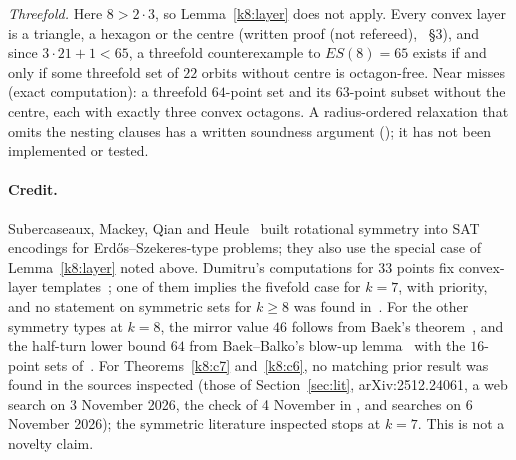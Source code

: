 \emph{Threefold.} Here $8>2\cdot3$, so Lemma~\ref{k8:layer} does not apply. Every convex layer is a triangle, a
hexagon or the centre (written proof (not refereed), ~\S3), and since $3\cdot21+1<65$, a threefold
counterexample to $ES(8)=65$ exists if and only if some threefold set of $22$ orbits without centre is octagon-free.
Near misses (exact computation): a threefold $64$-point set and its $63$-point subset without the centre, each with
exactly three convex octagons. A radius-ordered relaxation that omits the nesting clauses has a written soundness
argument (); it has not been implemented or tested.

\paragraph{Credit.} Subercaseaux, Mackey, Qian and Heule~\cite{SMQH25,Mac25} built rotational symmetry into SAT
encodings for Erd\H{o}s--Szekeres-type problems; they also use the special case of Lemma~\ref{k8:layer}
noted above. Dumitru's computations for $33$ points fix convex-layer
templates~\cite[\S7, Table~1]{Dum25}; one of them implies the fivefold case for $k=7$, with priority, and no statement on
symmetric sets for $k\ge8$ was found in~\cite{Dum25}. For the other symmetry types at $k=8$, the mirror value $46$
follows from Baek's theorem~\cite{Bae25}, and the half-turn lower bound $64$ from Baek--Balko's blow-up
lemma~\cite[Lemma~14]{BB25} with the $16$-point sets of~\cite{SMQH25,Mac25}. For Theorems~\ref{k8:c7} and~\ref{k8:c6},
no matching prior result was found in the sources inspected (those of Section~\ref{sec:lit}, arXiv:2512.24061, a web
search on 3 November 2026, the check of 4 November in , and searches on 6 November 2026);
the symmetric literature inspected stops at $k=7$. This is not a novelty claim.
